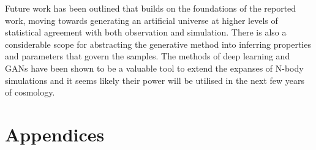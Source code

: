 \documentclass[twocolumn]{article}
\numberwithin{equation}{section}
\begin{document}
Future work has been outlined that builds on the foundations of the reported work, moving towards generating an artificial 
universe at higher levels of statistical agreement with both observation and simulation. There is also a considerable scope 
for abstracting the generative method into inferring properties and parameters that govern the samples.
The methods of deep learning and GANs have been shown to be a valuable tool to extend the expanses of N-body simulations and it 
seems likely their power will be utilised in the next few years of cosmology. 

{\footnotesize  %
}


\setcounter{section}{0}
\section*{Appendices}

%
\appendix


\end{document}
